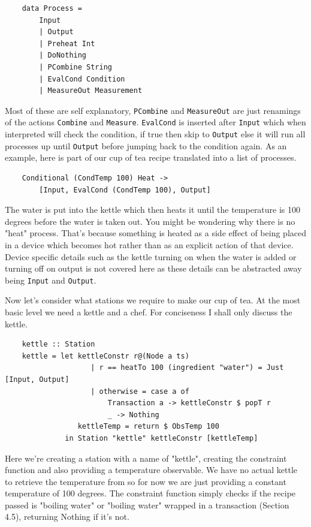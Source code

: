 \documentclass[11pt]{article}
\begin{document}
\begin{lstlisting}
    data Process =
        Input
        | Output
        | Preheat Int
        | DoNothing
        | PCombine String
        | EvalCond Condition
        | MeasureOut Measurement
\end{lstlisting}

Most of these are self explanatory, \texttt{PCombine} and \texttt{MeasureOut} are just renamings of
the actions \texttt{Combine} and \texttt{Measure}. \texttt{EvalCond} is inserted after \texttt{Input}
which when interpreted will check the condition, if true then skip to \texttt{Output} else it will
run all processes up until \texttt{Output} before jumping back to the condition again. As an example,
here is part of our cup of tea recipe translated into a list of processes.

\begin{lstlisting}
    Conditional (CondTemp 100) Heat ->
        [Input, EvalCond (CondTemp 100), Output]
\end{lstlisting}

The water is put into the kettle which then heats it until the temperature is 100 degrees
before the water is taken out. You might be wondering why there is no "heat" process.
That's because something is heated as a side effect of being placed in a device which becomes hot
rather than as an explicit action of that device. Device specific details such as the kettle turning
on when the water is added or turning off on output is not covered here as these details can
be abstracted away being \texttt{Input} and \texttt{Output}.

\medbreak

Now let's consider what stations we require to make our cup of tea. At the most basic level
we need a kettle and a chef. For conciseness I shall only discuss the kettle.

\begin{lstlisting}
    kettle :: Station
    kettle = let kettleConstr r@(Node a ts)
                    | r == heatTo 100 (ingredient "water") = Just [Input, Output]
                    | otherwise = case a of
                        Transaction a -> kettleConstr $ popT r
                        _ -> Nothing
                 kettleTemp = return $ ObsTemp 100
              in Station "kettle" kettleConstr [kettleTemp]
\end{lstlisting}

Here we're creating a station with a name of "kettle", creating the constraint function
and also providing a temperature observable. We have no actual kettle to retrieve the temperature
from so for now we are just providing a constant temperature of 100 degrees. The constraint function
simply checks if the recipe passed is "boiling water" or "boiling water" wrapped in a transaction (Section 4.5),
returning Nothing if it's not.
\end{document}
